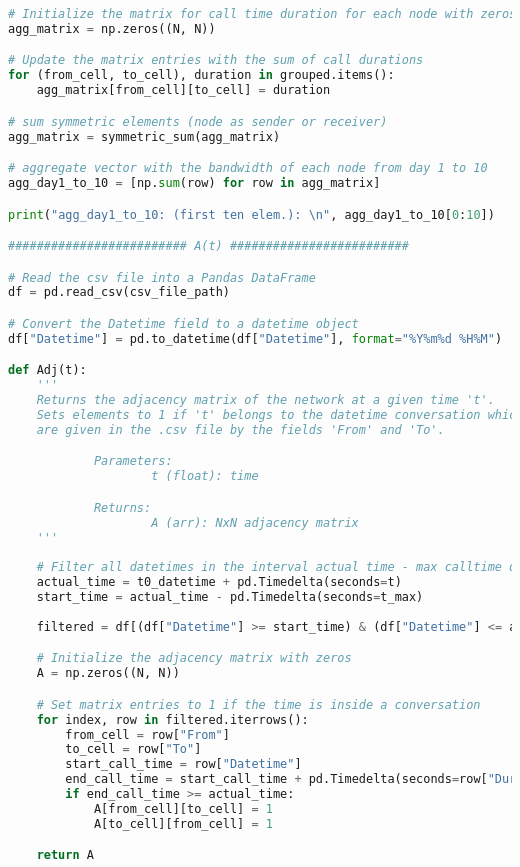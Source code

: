 \begin{lstlisting}[language=Python, caption=Second synthetic experiment]
# Initialize the matrix for call time duration for each node with zeros
agg_matrix = np.zeros((N, N))

# Update the matrix entries with the sum of call durations
for (from_cell, to_cell), duration in grouped.items():
    agg_matrix[from_cell][to_cell] = duration

# sum symmetric elements (node as sender or receiver)  
agg_matrix = symmetric_sum(agg_matrix)

# aggregate vector with the bandwidth of each node from day 1 to 10
agg_day1_to_10 = [np.sum(row) for row in agg_matrix]

print("agg_day1_to_10: (first ten elem.): \n", agg_day1_to_10[0:10])

######################### A(t) #########################

# Read the csv file into a Pandas DataFrame
df = pd.read_csv(csv_file_path)

# Convert the Datetime field to a datetime object
df["Datetime"] = pd.to_datetime(df["Datetime"], format="%Y%m%d %H%M")

def Adj(t):
    '''
    Returns the adjacency matrix of the network at a given time 't'. 
    Sets elements to 1 if 't' belongs to the datetime conversation which nodes
    are given in the .csv file by the fields 'From' and 'To'.

            Parameters:
                    t (float): time

            Returns:
                    A (arr): NxN adjacency matrix
    '''
    
    # Filter all datetimes in the interval actual time - max calltime duration
    actual_time = t0_datetime + pd.Timedelta(seconds=t)
    start_time = actual_time - pd.Timedelta(seconds=t_max)
    
    filtered = df[(df["Datetime"] >= start_time) & (df["Datetime"] <= actual_time)]

    # Initialize the adjacency matrix with zeros
    A = np.zeros((N, N))

    # Set matrix entries to 1 if the time is inside a conversation
    for index, row in filtered.iterrows():
        from_cell = row["From"]
        to_cell = row["To"]
        start_call_time = row["Datetime"]
        end_call_time = start_call_time + pd.Timedelta(seconds=row["Duration(seconds)"])
        if end_call_time >= actual_time:
            A[from_cell][to_cell] = 1
            A[to_cell][from_cell] = 1

    return A


\end{lstlisting}
